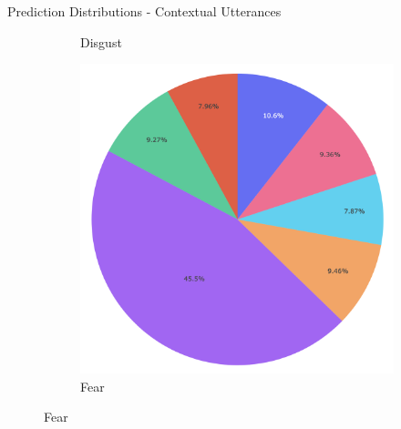 \documentclass[11pt,aspectratio=169]{beamer}
\begin{document}
\begin{frame}{Prediction Distributions - Contextual Utterances}
\begin{figure}[!ht]
\begin{subfigure}{0.19\textwidth}
      \caption*{Disgust}
    \end{subfigure}\hfil
    \begin{subfigure}{0.19\textwidth}
      \includegraphics[width=\linewidth]{figures/fear_context.png}
      \caption*{Fear}
    \end{subfigure}
    

\end{figure}
\end{frame}
\end{document}

